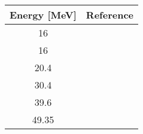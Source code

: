 \begin{tabular}{|c||c|} 
    \hline 
    \bf{Energy [MeV]} & \bf{Reference} \\
    \hline
    \hline 
    16 & \cite{Makofske68}\\
    16 & \cite{Abbott87}\\
    20.4 & \cite{Wassenaar89}\\
    30.4 & \cite{Hardacre71}\\
    39.6 & \cite{Boyd68}\\
    49.35 & \cite{Mani71}\\
    \hline
\end{tabular}
